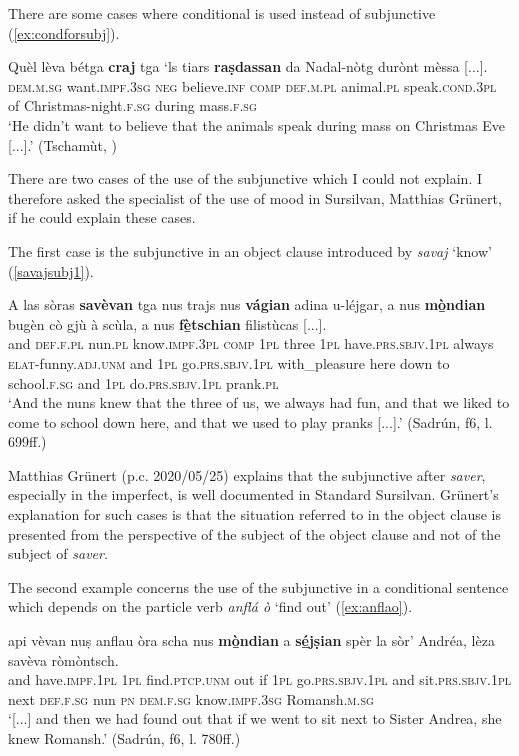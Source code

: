 There are some cases where conditional is used instead of subjunctive (\ref{ex:condforsubj}).

\ea
\label{ex:condforsubj}
\gll Quèl lèva bétga \textbf{craj} tga `ls tiars \textbf{raṣdassan} da Nadal-nòtg durònt mèssa [...].\\
\textsc{dem.m.sg} want.\textsc{impf.3sg} \textsc{neg} believe.\textsc{inf} \textsc{comp} \textsc{def.m.pl} animal.\textsc{pl} speak.\textsc{cond.3pl} of Christmas-night.\textsc{f.sg} during mass.\textsc{f.sg}\\
\glt `He didn't want to believe that the animals speak during mass on Christmas Eve [...].' (Tschamùt, \citealt[132]{Büchli1966})
\z

There are two cases of the use of the subjunctive which I could not explain. I therefore asked the specialist of the use of mood in Sursilvan, Matthias Grünert, if he could explain these cases.

The first case is the subjunctive in an object clause introduced by \textit{savaj} `know' (\ref{savajsubj1}).

\ea
\label{savajsubj1}
\gll    A las sòras \textbf{savèvan} tga nus trajs nus \textbf{vágian} adina u-léjgar, a nus \textbf{mò̱ndian} bugèn cò gjù à scùla, a nus \textbf{fè̱tschian} filistùcas [...].\\
and \textsc{def.f.pl} nun.\textsc{pl} know.\textsc{impf.3pl} \textsc{comp} \textsc{1pl} three \textsc{1pl} have.\textsc{prs.sbjv.1pl} always \textsc{elat}-funny.\textsc{adj.unm} and \textsc{1pl} go.\textsc{prs.sbjv.1pl} with\_pleasure here down to school.\textsc{f.sg} and \textsc{1pl} do.\textsc{prs.sbjv.1pl} prank.\textsc{pl}\\
\glt `And the nuns knew that the three of us, we always had fun, and that we liked to come to school down here, and that we used to play pranks [...].' (Sadrún, f6, l. 699ff.)
\z

Matthias Grünert (p.c. 2020/05/25) explains that the subjunctive after \textit{saver}, especially in the imperfect, is well documented in Standard Sursilvan. Grünert's explanation for such cases is that the situation referred to in the object clause is presented from the perspective of the subject of the object clause and not of the subject of \textit{saver}.


The second example concerns the use of the subjunctive in a conditional sentence which depends on the particle verb \textit{anflá ò} `find out' (\ref{ex:anflao}). 

\ea
\label{ex:anflao}
\gll   [...] api vèvan nuṣ anflau òra scha nus \textbf{mò̱ndian} a \textbf{sé̱jṣian} spèr la sòr’ Andréa, lèza savèva ròmòntsch.\\
{} and have.\textsc{impf.1pl} \textsc{1pl}  find.\textsc{ptcp.unm} out if \textsc{1pl} go.\textsc{prs.sbjv.1pl} and sit.\textsc{prs.sbjv.1pl} next  \textsc{def.f.sg} nun \textsc{pn} \textsc{dem.f.sg} know.\textsc{impf.3sg} Romansh.\textsc{m.sg}\\
\glt `[...] and then we had found out that if we went to sit next to Sister Andrea, she knew Romansh.' (Sadrún, f6, l. 780ff.)
\z

